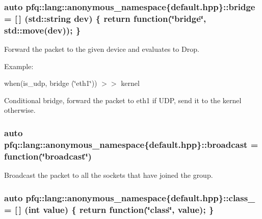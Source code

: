 \subsubsection[{\texorpdfstring{bridge}{bridge}}]{\setlength{\rightskip}{0pt plus 5cm}auto pfq\+::lang\+::anonymous\+\_\+namespace\{default.\+hpp\}\+::bridge = \mbox{[}$\,$\mbox{]} (std\+::string dev) \{ return {\bf function}(\char`\"{}bridge\char`\"{}, std\+::move(dev)); \}}\hypertarget{namespacepfq_1_1lang_1_1anonymous__namespace_02default_8hpp_03_ad318dd8fb6441b78bdfb056173e5a7e2}{}\label{namespacepfq_1_1lang_1_1anonymous__namespace_02default_8hpp_03_ad318dd8fb6441b78bdfb056173e5a7e2}


Forward the packet to the given device and evaluates to {\ttfamily Drop}. 

Example\+:

when(is\+\_\+udp, bridge (\char`\"{}eth1\char`\"{})) $>$$>$ kernel

Conditional bridge, forward the packet to eth1 if U\+DP, send it to the kernel otherwise. 
\subsubsection[{\texorpdfstring{broadcast}{broadcast}}]{\setlength{\rightskip}{0pt plus 5cm}auto pfq\+::lang\+::anonymous\+\_\+namespace\{default.\+hpp\}\+::broadcast = {\bf function}(\char`\"{}broadcast\char`\"{})}\hypertarget{namespacepfq_1_1lang_1_1anonymous__namespace_02default_8hpp_03_ac9e0f3ad7fa32146565f4aaab709d19d}{}\label{namespacepfq_1_1lang_1_1anonymous__namespace_02default_8hpp_03_ac9e0f3ad7fa32146565f4aaab709d19d}


Broadcast the packet to all the sockets that have joined the group. 

\subsubsection[{\texorpdfstring{class\+\_\+}{class_}}]{\setlength{\rightskip}{0pt plus 5cm}auto pfq\+::lang\+::anonymous\+\_\+namespace\{default.\+hpp\}\+::class\+\_\+ = \mbox{[}$\,$\mbox{]} (int value) \{ return {\bf function}(\char`\"{}class\char`\"{}, value); \}}\hypertarget{namespacepfq_1_1lang_1_1anonymous__namespace_02default_8hpp_03_a73e1198ca0a5077b083d7900cff17505}{}\label{namespacepfq_1_1lang_1_1anonymous__namespace_02default_8hpp_03_a73e1198ca0a5077b083d7900cff17505}


